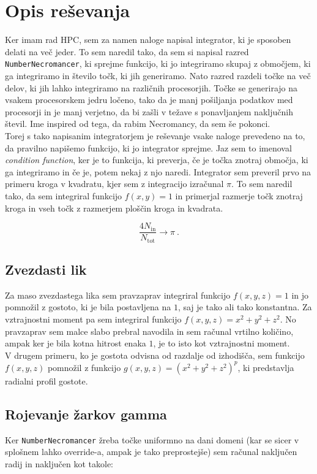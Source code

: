 \documentclass[a4paper]{article}
\begin{document}
\section{Opis reševanja}
Ker imam rad HPC, sem za namen naloge napisal integrator, ki je sposoben delati na več jeder. To sem naredil tako, da sem
si napisal razred \texttt{NumberNecromancer}, ki sprejme funkcijo, ki jo integriramo skupaj z območjem, ki ga integriramo in 
število točk, ki jih generiramo. Nato razred razdeli točke na več delov, ki jih lahko integriramo na različnih procesorjih. 
Točke se generirajo na vsakem procesorskem jedru ločeno, tako da je manj pošiljanja podatkov med procesorji in je manj verjetno, da 
bi zašli v težave s ponavljanjem naključnih števil. Ime inspired od tega, da rabim Necromancy, da sem še pokonci. \\

Torej s tako napisanim integratorjem je reševanje vsake naloge prevedeno na to, da pravilno napišemo funkcijo, ki jo integrator
sprejme. Jaz sem to imenoval \textit{condition function}, ker je to funkcija, ki preverja, če je točka znotraj območja, ki ga
integriramo in če je, potem nekaj z njo naredi. Integrator sem preveril prvo na primeru kroga v kvadratu, kjer sem z integracijo
izračunal $\pi$. To sem naredil tako, da sem integriral funkcijo $f(x,y) = 1$ in primerjal razmerje točk znotraj kroga in vseh
točk z razmerjem ploščin kroga in kvadrata. 

\begin{equation}
    \frac{4 N_{\mathrm{in}}}{N_{\mathrm{tot}}} \to \pi \>.
\end{equation}

\subsection{Zvezdasti lik}
Za maso zvezdastega lika sem pravzaprav integriral funkcijo $f(x,y,z) = 1$ in jo pomnožil z gostoto, ki je bila postavljena na
$1$, saj je tako ali tako konstantna. Za vztrajnostni moment pa sem integriral funkcijo $f(x,y,z) = x^2 + y^2 + z^2$. No pravzaprav
sem malce slabo prebral navodila in sem računal vrtilno količino, ampak ker je bila kotna hitrost enaka $1$, je to isto kot
vztrajnostni moment. \\

V drugem primeru, ko je gostota odvisna od razdalje od izhodišča, sem funkcijo $f(x,y,z)$ pomnožil z funkcijo 
$g(x,y,z) = (x^2 + y^2 + z^2)^p$, ki predstavlja radialni profil gostote.

\subsection{Rojevanje žarkov gamma}
Ker \texttt{NumberNecromancer} žreba točke uniformno na dani domeni (kar se sicer v splošnem lahko override-a, ampak je tako 
preprostejše) sem računal naključen radij in naključen kot takole:
\end{document}

